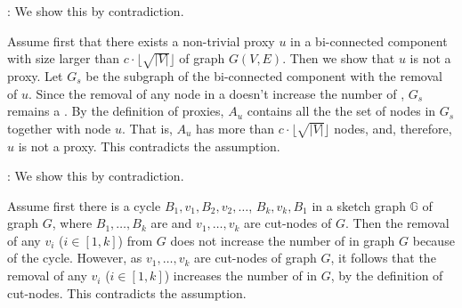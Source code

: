 : We show this by contradiction.

Assume first that there exists a non-trivial proxy $u$ in a bi-connected component with size larger than $c \cdot\lfloor\sqrt{|V|}\rfloor$ of graph $G(V, E)$.
Then we show that $u$ is not a proxy. Let $G_s$ be the subgraph of the bi-connected component with the removal of $u$. Since the removal of any node in a \bc doesn't increase the number of \ccs, $G_s$ remains a \cc. By the definition of proxies, $A_u$ contains all the  the set of nodes in $G_s$ together with node $u$. That is, $A_u$ has more than $c \cdot\lfloor\sqrt{|V|}\rfloor$ nodes, and, therefore, $u$ is not a proxy. This contradicts the assumption.
\eop


: We show this by contradiction.

Assume first there is a cycle $B_1, v_1, B_2, v_2, \ldots$, $B_k, v_k, B_1$ in a sketch graph $\mathbb{G}$ of graph $G$, where $B_1, \ldots, B_k$ are \bccs and $v_1, \ldots, v_k$ are cut-nodes of $G$. Then the removal of any $v_i$ ($i\in[1, k]$) from $G$ does not increase the number of \ccs in graph $G$ because of the cycle.
%
However, as $v_1, \ldots, v_k$ are cut-nodes of graph $G$, it follows that the removal of any $v_i$ ($i\in[1, k]$) increases the number of \ccs in $G$, by the definition of cut-nodes.
This contradicts the assumption.
\eop
